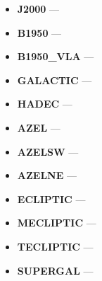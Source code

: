 \begin{itemize}
\item {\bf J2000} --- 

\item {\bf B1950} --- 

\item {\bf B1950\_VLA} --- 

\item {\bf GALACTIC} --- 

\item {\bf HADEC} --- 

\item {\bf AZEL} --- 
 
\item {\bf AZELSW} --- 
 
\item {\bf AZELNE} --- 

\item {\bf ECLIPTIC} --- 

\item {\bf MECLIPTIC} --- 

\item {\bf TECLIPTIC} --- 

\item {\bf SUPERGAL} --- 
\end{itemize}


